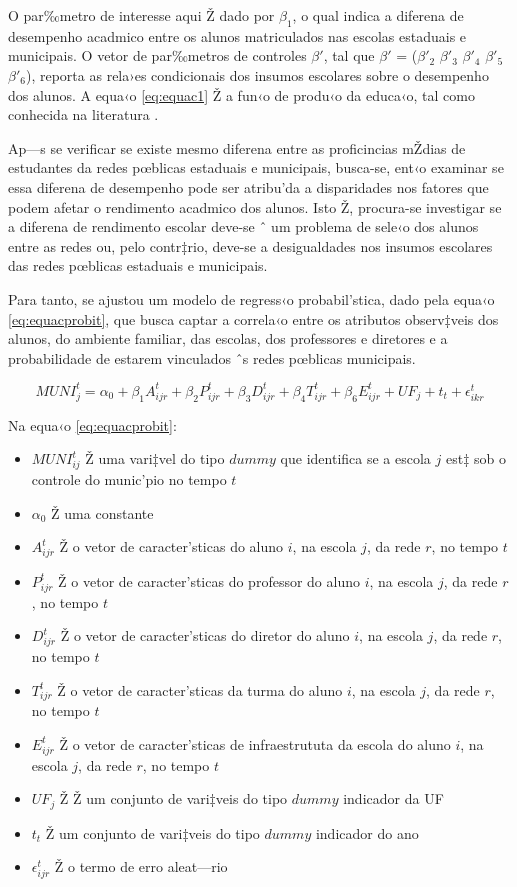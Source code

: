 \documentclass[a4paper, 12pt]{article}
\begin{document}
O par‰metro de interesse aqui Ž dado por $\beta_1$, o qual indica a diferena de desempenho acadmico entre os alunos matriculados nas escolas estaduais e municipais. O vetor de par‰metros de controles $\beta'$, tal que $\beta'$ = ($\beta'_2$ $\beta'_3$ $\beta'_4$ $\beta'_5$ $\beta'_6$), reporta as rela›es condicionais dos insumos escolares sobre o desempenho dos alunos. A equa‹o \ref{eq:equac1} Ž a fun‹o de produ‹o da educa‹o, tal como conhecida na literatura  \cite{hanushek_education_1994}.

Ap—s se verificar se existe mesmo diferena entre as proficincias mŽdias de estudantes da redes pœblicas estaduais e municipais, busca-se, ent‹o examinar se essa diferena de desempenho pode ser atribu’da a disparidades nos fatores que podem afetar o rendimento acadmico dos alunos. Isto Ž, procura-se investigar se a diferena de rendimento escolar deve-se ˆ um problema de sele‹o dos alunos entre as redes ou, pelo contr‡rio, deve-se a desigualdades nos insumos escolares das redes pœblicas estaduais e municipais.

Para tanto, se ajustou um modelo de regress‹o probabil’stica, dado pela equa‹o \ref{eq:equacprobit}, que busca captar a correla‹o entre os atributos observ‡veis dos alunos, do ambiente familiar, das escolas, dos professores e diretores e a probabilidade de estarem vinculados ˆs redes pœblicas municipais.


\begin{equation}
 MUNI_{j}^{t} = \alpha_0 + \beta_1A_{ijr}^{t} + \beta_2 P_{ijr}^{t} + \beta_3 D_{ijr}^{t} + \beta_4 T_{ijr}^{t} + \beta_6 E_{ijr}^{t} +  UF_{j}  + t_{t} +  \epsilon_{ikr}^{t} \label{eq:equacprobit}
\end{equation}

Na equa‹o \ref{eq:equacprobit}:
\begin{itemize}
\item $MUNI_{ij}^{t}$ Ž uma vari‡vel do tipo $dummy$ que identifica se a escola $j$ est‡ sob o controle do munic’pio no tempo $t$
\item$\alpha_0$ Ž uma constante
\item$A_{ijr}^{t}$ Ž o vetor de caracter’sticas do aluno $i$, na escola $j$, da rede $r$, no tempo $t$
\item$P_{ijr}^{t}$ Ž o vetor de caracter’sticas do professor do aluno $i$, na escola $j$, da rede $r$, no tempo $t$
\item$D_{ijr}^{t}$ Ž o vetor de caracter’sticas do diretor do aluno $i$, na escola $j$, da rede $r$, no tempo $t$
\item$T_{ijr}^{t}$ Ž o vetor de caracter’sticas da turma do aluno $i$, na escola $j$, da rede $r$, no tempo $t$
\item$E_{ijr}^{t}$ Ž o vetor de caracter’sticas de infraestrututa da escola do aluno $i$, na escola $j$, da rede $r$, no tempo $t$
\item$UF_{j}$ Ž Ž um conjunto de vari‡veis do tipo $dummy$ indicador da UF 
\item$t_{t}$ Ž um conjunto de vari‡veis do tipo $dummy$ indicador do ano
\item$\epsilon_{ijr}^{t}$ Ž o termo de erro aleat—rio 
\end{itemize}
\end{document}
